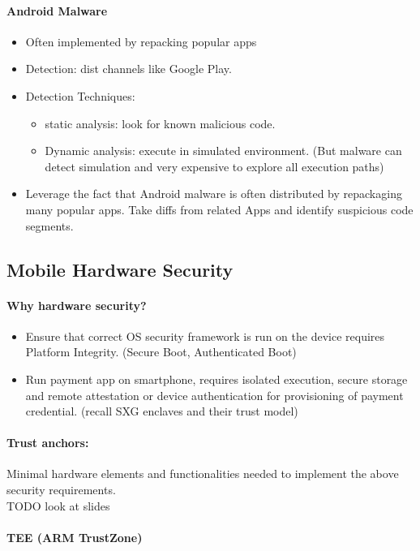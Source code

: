 \paragraph{Android Malware}
\begin{itemize}
    \item Often implemented by repacking popular apps
    \item Detection: dist channels like Google Play.
    \item Detection Techniques:
    \begin{itemize}
        \item static analysis: look for known malicious code.
        \item Dynamic analysis: execute in simulated environment. (But malware can detect simulation and very expensive to explore all execution paths)
    \end{itemize}{}
    \item Leverage the fact that Android malware is often distributed by repackaging many popular apps. Take diffs from related Apps and identify suspicious code segments.
\end{itemize}{}

\subsection{Mobile Hardware Security}
\paragraph{Why hardware security?}
\begin{itemize}
    \item Ensure that correct OS security framework is run on the device requires Platform Integrity. (Secure Boot, Authenticated Boot)
    \item Run payment app on smartphone, requires isolated execution, secure storage and remote attestation or device authentication for provisioning of payment credential. (recall SXG enclaves and their trust model)
\end{itemize}{}

\paragraph{Trust anchors:}
Minimal hardware elements and functionalities needed to implement the above security requirements.\\
TODO look at slides

\paragraph{TEE (ARM TrustZone)}